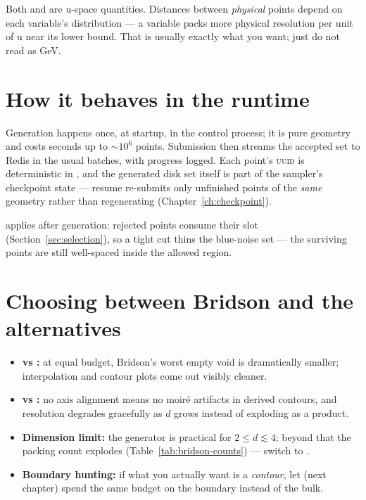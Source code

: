 \begin{jwarn}
Both  and  are u-space quantities. Distances between
\emph{physical} points depend on each variable's distribution --- a  variable
packs more physical resolution per unit of u near its lower bound. That is usually
exactly what you want; just do not read  as GeV.
\end{jwarn}

\section{How it behaves in the runtime}
\label{sec:bridson-runtime}

Generation happens once, at startup, in the control process; it is pure geometry and
costs seconds up to $\sim$$10^6$ points. Submission then streams the accepted set to
Redis in the usual batches, with progress logged. Each point's \textsc{uuid} is
deterministic in , and the generated disk set itself is part of the
sampler's checkpoint state --- resume re-submits only unfinished points of the
\emph{same} geometry rather than regenerating (Chapter~\ref{ch:checkpoint}).

 applies after generation: rejected points consume their slot
(Section~\ref{sec:selection}), so a tight cut thins the blue-noise set --- the surviving
points are still well-spaced inside the allowed region.

\section{Choosing between Bridson and the alternatives}

\begin{itemize}
  \item \textbf{vs :} at equal budget, Bridson's worst empty void is
        dramatically smaller; interpolation and contour plots come out visibly cleaner.
  \item \textbf{vs :} no axis alignment means no moiré artifacts in
        derived contours, and resolution degrades gracefully as $d$ grows instead of
        exploding as a product.
  \item \textbf{Dimension limit:} the generator is practical for $2 \le d \lesssim 4$;
        beyond that the packing count explodes (Table~\ref{tab:bridson-counts}) ---
        switch to .
  \item \textbf{Boundary hunting:} if what you actually want is a \emph{contour}, let
         (next chapter) spend the same budget on the boundary
        instead of the bulk.
\end{itemize}

